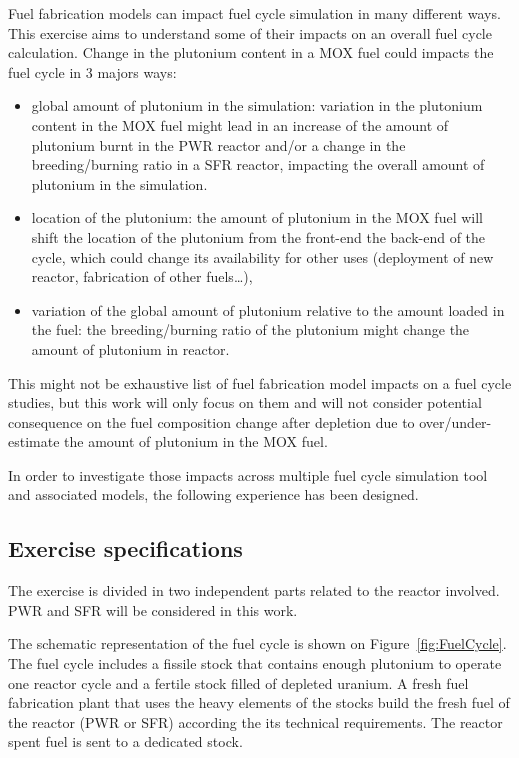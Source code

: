 Fuel fabrication models can impact fuel cycle simulation in many different ways.
This exercise aims to understand some of their impacts on an overall fuel cycle
calculation. Change in the plutonium content in a \gls{MOX} fuel could impacts
the fuel cycle in 3 majors ways:

\begin{itemize}
    \item global amount of plutonium in the simulation: variation in the
        plutonium content in the \gls{MOX} fuel might lead in an increase of the
        amount of plutonium burnt in the \gls{PWR} reactor and/or a change in the
        breeding/burning ratio in a \gls{SFR} reactor, impacting the overall amount of
        plutonium in the simulation.
    \item location of the plutonium: the amount of plutonium in the \gls{MOX}
        fuel will shift the location of the plutonium from the front-end the
        back-end of the cycle, which could change its availability for other
        uses (deployment of new reactor, fabrication of other fuels\ldots),
    \item variation of the global amount of plutonium relative to the amount
        loaded in the fuel: the breeding/burning ratio of the plutonium might
        change the amount of plutonium in reactor.
\end{itemize}

This might not be exhaustive list of fuel fabrication model impacts on a fuel
cycle studies, but this work will only focus on them and will not consider
potential consequence on the fuel composition change after depletion due to
over/under-estimate the amount of plutonium in the \gls{MOX} fuel.

In order to investigate those impacts across multiple fuel cycle simulation tool
and associated models, the following experience has been designed.

\subsection{Exercise specifications}

The exercise is divided in two independent parts related to the reactor
involved. \gls{PWR} and \gls{SFR} will be considered in this work.

The schematic representation of the fuel cycle is shown on
Figure~\ref{fig:FuelCycle}. The fuel cycle includes a fissile stock that
contains enough plutonium to operate one reactor cycle and a fertile stock
filled of depleted uranium. A fresh fuel fabrication plant that uses the heavy
elements of the stocks build the fresh fuel of the reactor (\gls{PWR}  or \gls{SFR})
according the its technical requirements. The reactor spent fuel is sent to a
dedicated stock.

